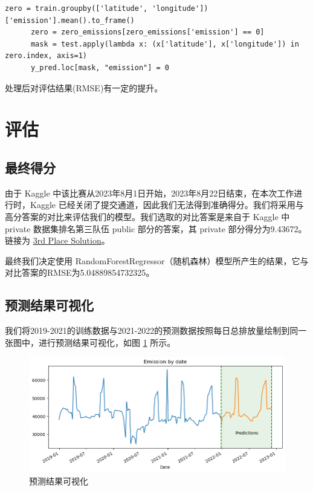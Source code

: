 \documentclass{ctexart}
\begin{document}
\begin{sloppypar}
\begin{lstlisting}[style=Python]
      zero = train.groupby(['latitude', 'longitude'])['emission'].mean().to_frame()
      zero = zero_emissions[zero_emissions['emission'] == 0]
      mask = test.apply(lambda x: (x['latitude'], x['longitude']) in zero.index, axis=1)
      y_pred.loc[mask, "emission"] = 0
\end{lstlisting}

处理后对评估结果(RMSE)有一定的提升。

\section{评估}

% 
% 

\subsection{最终得分}

由于 Kaggle 中该比赛从2023年8月1日开始，2023年8月22日结束，在本次工作进行时，Kaggle 已经关闭了提交通道，因此我们无法得到准确得分。我们将采用与高分答案的对比来评估我们的模型。我们选取的对比答案是来自于 Kaggle 中 private 数据集排名第三队伍 public 部分的答案，其 private 部分得分为9.43672。链接为 \href{https://www.kaggle.com/competitions/playground-series-s3e20/discussion/433822}{3rd Place Solution}。

最终我们决定使用 RandomForestRegressor（随机森林）模型所产生的结果，它与对比答案的RMSE为5.04889854732325。

\subsection{预测结果可视化}

我们将2019-2021的训练数据与2021-2022的预测数据按照每日总排放量绘制到同一张图中，进行预测结果可视化，如图 \ref{fig:13} 所示。

\begin{figure}[H]
      \centering
      \includegraphics[width=1\textwidth]{output13.png}
      \caption{预测结果可视化}
      \label{fig:13}
\end{figure}


\end{sloppypar}
\end{document}
